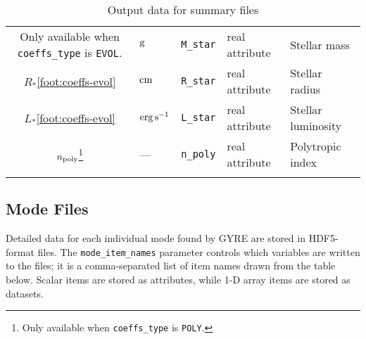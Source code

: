 \documentclass{article}
\newcommand{\Rstar}{\ensuremath{R_{\ast}}}
\newcommand{\Lstar}{\ensuremath{L_{\ast}}}
\newcommand{\cm}{\ensuremath{{\rm cm}}}
\newcommand{\gram}{\ensuremath{{\rm g}}}
\newcommand{\second}{\ensuremath{{\rm s}}}
\newcommand{\erg}{\ensuremath{{\rm erg}}}
\begin{document}
\begin{center}
\begin{longtable}{cllll}
{\label{foot:coeffs-evol}
Only available when \texttt{coeffs\_type} is \texttt{EVOL}.} & 
\gram & \texttt{M\_star} & real attribute & Stellar mass \\
\Rstar\cref{foot:coeffs-evol} & \cm & \texttt{R\_star} & real attribute & Stellar radius \\
\Lstar\cref{foot:coeffs-evol} & $\erg\,\second^{-1}$ & \texttt{L\_star} & real attribute & Stellar luminosity \\
$n_{\rm poly}$\footnote{%
\label{foot:coeffs-poly}
Only available when \texttt{coeffs\_type} is \texttt{POLY}.} & 
--- & \texttt{n\_poly} & real attribute & Polytropic index \\ \hline
\caption{Output data for summary files}
\end{longtable}
\end{center}

\newpage

\subsection*{Mode Files}

Detailed data for each individual mode found by GYRE are stored in HDF5-format
files. The \texttt{mode\_item\_names} parameter controls which variables
are written to the files; it is a comma-separated list of item names
drawn from the table below. Scalar items are stored as attributes,
while 1-D array items are stored as datasets.
\end{document}
